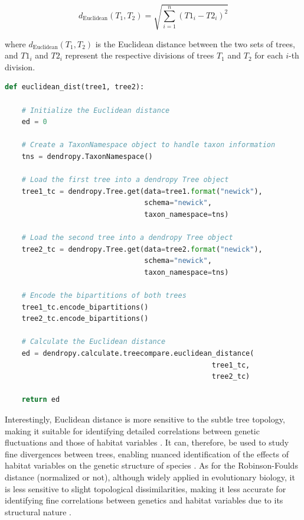 \begin{equation}\label{eq:euclidean}
    d_{\text{Euclidean}}(T_1, T_2) = \sqrt{\sum_{i=1}^{n} (T1_i - T2_i)^2}
\end{equation}

where $ d_{\text{Euclidean}}(T_1, T_2)$ is the Euclidean distance between the two sets of trees, and $T1_i$ and $T2_i$ represent the respective divisions of trees $T_1$ and $T_2$ for each $i$-th division.

\begin{lstlisting}[label=lst:euclideanDist,language=Python,caption=Python script for calculating the Euclidean distance using the ete3 and the dendropy packages in the aPhyloGeo package. The Newick format represents the phylogenetic and variable trees in text form.]
def euclidean_dist(tree1, tree2):

    # Initialize the Euclidean distance
    ed = 0

    # Create a TaxonNamespace object to handle taxon information
    tns = dendropy.TaxonNamespace()

    # Load the first tree into a dendropy Tree object
    tree1_tc = dendropy.Tree.get(data=tree1.format("newick"),
                                 schema="newick",
                                 taxon_namespace=tns)

    # Load the second tree into a dendropy Tree object
    tree2_tc = dendropy.Tree.get(data=tree2.format("newick"),
                                 schema="newick",
                                 taxon_namespace=tns)

    # Encode the bipartitions of both trees
    tree1_tc.encode_bipartitions()
    tree2_tc.encode_bipartitions()

    # Calculate the Euclidean distance
    ed = dendropy.calculate.treecompare.euclidean_distance(
                                                 tree1_tc,
                                                 tree2_tc)

    return ed
\end{lstlisting}

Interestingly, Euclidean distance is more sensitive to the subtle tree topology, making it suitable for identifying detailed correlations between genetic fluctuations and those of habitat variables \citep{czarna2006topology}. It can, therefore, be used to study fine divergences between trees, enabling nuanced identification of the effects of habitat variables on the genetic structure of species \citep{czarna2006topology}. As for the Robinson-Foulds distance (normalized or not), although widely applied in evolutionary biology, it is less sensitive to slight topological dissimilarities, making it less accurate for identifying fine correlations between genetics and habitat variables due to its structural nature \citep{smith2019bayesian, smith2020information}.


